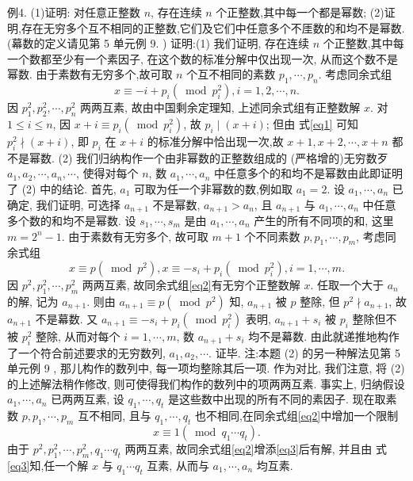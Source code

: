 例4. (1)证明: 对任意正整数 $n$, 存在连续 $n$ 个正整数,其中每一个都是幂数;
(2)证明,存在无穷多个互不相同的正整数,它们及它们中任意多个不厓数的和均不是幂数.
(幕数的定义请见第 5 单元例 9. )
证明:(1) 我们证明, 存在连续 $n$ 个正整数,其中每一个数都至少有一个素因子, 在这个数的标准分解中仅出现一次, 从而这个数不是幂数.
由于素数有无穷多个,故可取 $n$ 个互不相同的素数 $p_1, \cdots, p_n$. 考虑同余式组
$$
x \equiv-i+p_i\left(\bmod p_i^2\right), i=1,2, \cdots, n . \label{eq1}
$$
因 $p_1^2, p_2^2, \cdots, p_n^2$ 两两互素, 故由中国剩余定理知, 上述同余式组有正整数解 $x$. 对 $1 \leqslant i \leqslant n$, 因 $x+i \equiv p_i\left(\bmod p_i^2\right)$, 故 $p_i \mid(x+i)$; 但由 式\ref{eq1} 可知 $p_i^2 \nmid(x+ i)$, 即 $p_i$ 在 $x+i$ 的标准分解中恰出现一次,故 $x+1, x+2, \cdots, x+n$ 都不是幂数.
(2) 我们归纳构作一个由非幂数的正整数组成的 (严格增的)无穷数歹 $a_1, a_2, \cdots, a_n, \cdots$, 使得对每个 $n$, 数 $a_1, \cdots, a_n$ 中任意多个的和均不是幂数由此即证明了 (2) 中的结论.
首先, $a_1$ 可取为任一个非幂数的数,例如取 $a_1=2$. 设 $a_1, \cdots, a_n$ 已确定, 我们证明, 可选择 $a_{n+1}$ 不是幂数, $a_{n+1}>a_n$, 且 $a_{n+1}$ 与 $a_1, \cdots, a_n$ 中任意多个数的和均不是幂数.
设 $s_1, \cdots, s_m$ 是由 $a_1, \cdots, a_n$ 产生的所有不同项的和, 这里 $m=2^n-1$. 由于素数有无穷多个, 故可取 $m+1$ 个不同素数 $p, p_1, \cdots, p_m$, 考虑同余式组
$$
x \equiv p\left(\bmod p^2\right), x \equiv-s_i+p_i\left(\bmod p_i^2\right), i=1, \cdots, m . \label{eq2}
$$
因 $p^2, p_1^2, \cdots, p_m^2$ 两两互素, 故同余式组\ref{eq2}有无穷个正整数解 $x$. 任取一个大于 $a_n$ 的解, 记为 $a_{n+1}$. 则由 $a_{n+1} \equiv p\left(\bmod p^2\right)$ 知, $a_{n+1}$ 被 $p$ 整除, 但 $p^2 \nmid a_{n+1}$, 故 $a_{n+1}$ 不是幕数.
又 $a_{n+1} \equiv-s_i+p_i\left(\bmod p_i^2\right)$ 表明, $a_{n+1}+s_i$ 被 $p_i$ 整除但不被 $p_i^2$ 整除, 从而对每个 $i=1, \cdots, m$, 数 $a_{n+1}+s_i$ 均不是幕数.
由此就递推地构作了一个符合前述要求的无穷数列, $a_1, a_2, \cdots$. 证毕.
注:本题 (2) 的另一种解法见第 5 单元例 9 , 那儿构作的数列中, 每一项均整除其后一项.
作为对比, 我们注意, 将 (2) 的上述解法稍作修改, 则可使得我们构作的数列中的项两两互素.
事实上, 归纳假设 $a_1, \cdots, a_n$ 已两两互素, 设 $q_1, \cdots, q_t$ 是这些数中出现的所有不同的素因子.
现在取素数 $p, p_1, \cdots, p_m$ 互不相同, 且与 $q_1, \cdots, q_t$ 也不相同,在同余式组\ref{eq2}中增加一个限制
$$
x \equiv 1\left(\bmod q_1 \cdots q_t\right) . \label{eq3}
$$
由于 $p^2, p_1^2, \cdots, p_m^2, q_1 \cdots q_t$ 两两互素, 故同余式组\ref{eq2}增添\ref{eq3}后有解, 并且由 式\ref{eq3}知,任一个解 $x$ 与 $q_1 \cdots q_t$ 互素, 从而与 $a_1, \cdots, a_n$ 均互素.



